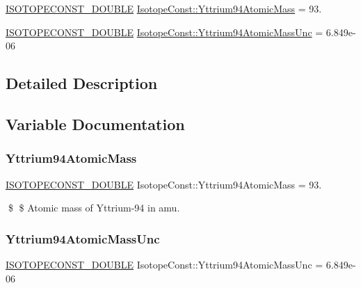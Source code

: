 \begin{DoxyCompactItemize}
\item 
\mbox{\hyperlink{group___isotope_const-_macros_ga8f45a7272ce02c0b4c65c44636ed719a}{I\+S\+O\+T\+O\+P\+E\+C\+O\+N\+S\+T\+\_\+\+D\+O\+U\+B\+LE}} \mbox{\hyperlink{group___isotope_const-_yttrium-_y94_gaa207b7f79a1f779774088c7860734cf7}{Isotope\+Const\+::\+Yttrium94\+Atomic\+Mass}} = 93.
\item 
\mbox{\hyperlink{group___isotope_const-_macros_ga8f45a7272ce02c0b4c65c44636ed719a}{I\+S\+O\+T\+O\+P\+E\+C\+O\+N\+S\+T\+\_\+\+D\+O\+U\+B\+LE}} \mbox{\hyperlink{group___isotope_const-_yttrium-_y94_ga10f4d5a61ac3ac2770db229381725660}{Isotope\+Const\+::\+Yttrium94\+Atomic\+Mass\+Unc}} = 6.\+849e-\/06
\end{DoxyCompactItemize}


\subsection{Detailed Description}


\subsection{Variable Documentation}
\mbox{\label{group___isotope_const-_yttrium-_y94_gaa207b7f79a1f779774088c7860734cf7}} 
\subsubsection{\texorpdfstring{Yttrium94\+Atomic\+Mass}{Yttrium94AtomicMass}}
{\footnotesize\ttfamily \mbox{\hyperlink{group___isotope_const-_macros_ga8f45a7272ce02c0b4c65c44636ed719a}{I\+S\+O\+T\+O\+P\+E\+C\+O\+N\+S\+T\+\_\+\+D\+O\+U\+B\+LE}} Isotope\+Const\+::\+Yttrium94\+Atomic\+Mass = 93.}

\$ \$ Atomic mass of Yttrium-\/94 in amu. \mbox{\label{group___isotope_const-_yttrium-_y94_ga10f4d5a61ac3ac2770db229381725660}} 
\subsubsection{\texorpdfstring{Yttrium94\+Atomic\+Mass\+Unc}{Yttrium94AtomicMassUnc}}
{\footnotesize\ttfamily \mbox{\hyperlink{group___isotope_const-_macros_ga8f45a7272ce02c0b4c65c44636ed719a}{I\+S\+O\+T\+O\+P\+E\+C\+O\+N\+S\+T\+\_\+\+D\+O\+U\+B\+LE}} Isotope\+Const\+::\+Yttrium94\+Atomic\+Mass\+Unc = 6.\+849e-\/06}

